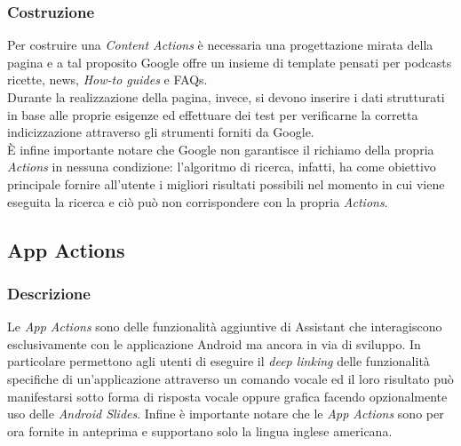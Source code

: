 		\subsubsection{Costruzione}
		Per costruire una \emph{Content Actions} è necessaria una progettazione mirata della pagina e a tal proposito Google offre un insieme di template pensati per podcasts ricette, news, \emph{How-to guides} e FAQs. \\
		Durante la realizzazione della pagina, invece, si devono inserire i dati strutturati in base alle proprie esigenze ed effettuare dei test per verificarne la corretta indicizzazione attraverso gli strumenti forniti da Google. \\
		È infine importante notare che Google non garantisce il richiamo della propria \emph{Actions} in nessuna condizione: l'algoritmo di ricerca, infatti, ha come obiettivo principale fornire all'utente i migliori risultati possibili nel momento in cui viene eseguita la ricerca e ciò può non corrispondere con la propria \emph{Actions}.
	\subsection{App Actions}
		\subsubsection{Descrizione}
		Le \emph{App Actions} sono delle funzionalità aggiuntive di Assistant che interagiscono esclusivamente con le applicazione Android ma ancora in via di sviluppo. In particolare permettono agli utenti di eseguire il \emph{deep linking} delle funzionalità specifiche di un'applicazione attraverso un comando vocale ed il loro risultato può manifestarsi sotto forma di risposta vocale oppure grafica facendo opzionalmente uso delle \emph{Android Slides}.
		Infine è importante notare che le \emph{App Actions} sono per ora fornite in anteprima e supportano solo la lingua inglese americana.
